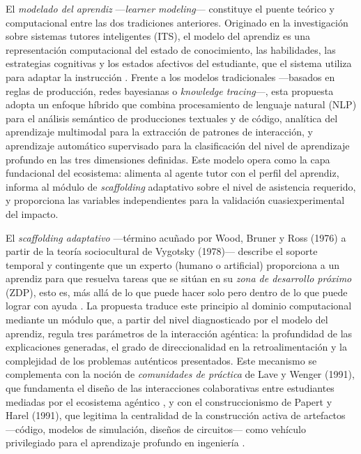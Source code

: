El \emph{modelado del aprendiz} —\emph{learner modeling}— constituye el puente
teórico y computacional entre las dos tradiciones anteriores. Originado en la
investigación sobre sistemas tutores inteligentes (ITS), el modelo del aprendiz es
una representación computacional del estado de conocimiento, las habilidades, las
estrategias cognitivas y los estados afectivos del estudiante, que el sistema utiliza
para adaptar la instrucción \cite{hooshyar2024systematic}. Frente a los modelos
tradicionales —basados en reglas de producción, redes bayesianas o \emph{knowledge
tracing}—, esta propuesta adopta un enfoque híbrido que combina procesamiento de
lenguaje natural (NLP) para el análisis semántico de producciones textuales y de
código, analítica del aprendizaje multimodal para la extracción de patrones de
interacción, y aprendizaje automático supervisado para la clasificación del nivel de
aprendizaje profundo en las tres dimensiones definidas. Este modelo opera como la
capa fundacional del ecosistema: alimenta al agente tutor con el perfil del aprendiz,
informa al módulo de \emph{scaffolding} adaptativo sobre el nivel de asistencia
requerido, y proporciona las variables independientes para la validación
cuasiexperimental del impacto.

El \emph{scaffolding adaptativo} —término acuñado por Wood, Bruner y Ross
(1976) a partir de la teoría sociocultural de Vygotsky (1978)— describe el soporte
temporal y contingente que un experto (humano o artificial) proporciona a un aprendiz
para que resuelva tareas que se sitúan en su \emph{zona de desarrollo próximo} (ZDP),
esto es, más allá de lo que puede hacer solo pero dentro de lo que puede lograr con
ayuda \cite{vygotsky1978mind, wood1976role}. La propuesta traduce este principio al
dominio computacional mediante un módulo que, a partir del nivel diagnosticado por el
modelo del aprendiz, regula tres parámetros de la interacción agéntica: la
profundidad de las explicaciones generadas, el grado de direccionalidad en la
retroalimentación y la complejidad de los problemas auténticos presentados. Este
mecanismo se complementa con la noción de \emph{comunidades de práctica} de Lave y
Wenger (1991), que fundamenta el diseño de las interacciones colaborativas entre
estudiantes mediadas por el ecosistema agéntico \cite{lave1991situated}, y con el
construccionismo de Papert y Harel (1991), que legitima la centralidad de la
construcción activa de artefactos —código, modelos de simulación, diseños de
circuitos— como vehículo privilegiado para el aprendizaje profundo en ingeniería
\cite{papert1991constructionism}.

